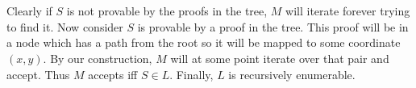 \documentclass[letterpaper,notitlepage,twoside]{article}
\begin{document}
\\
\\
Clearly if $S$ is not provable by the proofs in the tree, $M$ will iterate forever trying to find it. Now consider $S$ is provable by a proof in the tree. This proof will be in a node which has a path from the root so it will be mapped to some coordinate $\left( x,y \right)$. By our construction, $M$ will at some point iterate over that pair and accept. Thus $M$ accepts iff $S \in L$. Finally, $L$ is recursively enumerable.
\end{document}

